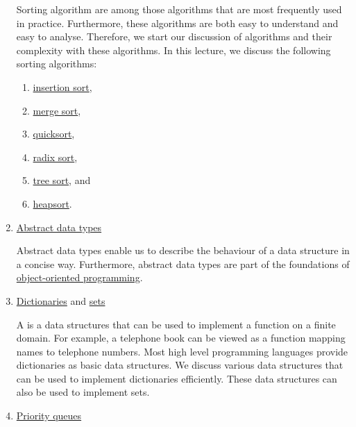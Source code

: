 \begin{enumerate}
      Sorting algorithm are among those algorithms that are most frequently used in practice.  Furthermore,
      these algorithms are both easy to understand and easy to analyse.  Therefore, we start our discussion of
      algorithms and their complexity with these algorithms.  In this lecture, we discuss the following
      sorting algorithms: 
      \begin{enumerate}
      \item \href{http://en.wikipedia.org/wiki/Insertion_sort}{insertion sort},
      \item \href{http://en.wikipedia.org/wiki/Merge_sort}{merge sort}, 
      \item \href{http://en.wikipedia.org/wiki/Quicksort}{quicksort}, 
      \item \href{http://en.wikipedia.org/wiki/Radix_sort}{radix sort}, 
      \item \href{https://en.wikipedia.org/wiki/Tree_sort}{tree sort}, and
      \item \href{https://en.wikipedia.org/wiki/Heapsort}{heapsort}.
      \end{enumerate}  
\item \href{http://en.wikipedia.org/wiki/Abstract_data_types}{Abstract data types}

      Abstract data types enable us to describe the behaviour of a data structure in a concise way.
      Furthermore, abstract data types are part of the foundations of 
      \href{https://en.wikipedia.org/wiki/Object-oriented_programming}{object-oriented programming}.
%  

\item \href{http://en.wikipedia.org/wiki/Map_(computer_science)}{Dictionaries} and \href{https://en.wikipedia.org/wiki/Set_(mathematics)}{sets}
  
      A  is a data structures that can be used to implement a function on a finite domain.
      For example, a telephone book can be viewed as a function mapping names to telephone numbers.
      Most high level programming languages provide dictionaries as basic data structures.  We discuss various data
      structures that can be used to implement dictionaries efficiently.   
      These data structures can also be used to implement sets.
\item \href{http://en.wikipedia.org/wiki/Priority_queue}{Priority queues}


\end{enumerate}
